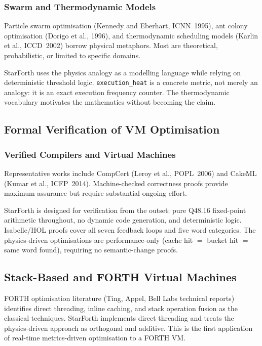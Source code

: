 \subsubsection{Swarm and Thermodynamic Models}

Particle swarm optimisation (Kennedy and Eberhart, ICNN~1995), ant colony
optimisation (Dorigo et al., 1996), and thermodynamic scheduling models
(Karlin et al., ICCD~2002) borrow physical metaphors. Most are theoretical,
probabilistic, or limited to specific domains.

StarForth uses the physics analogy as a modelling language while relying on
deterministic threshold logic. \texttt{execution\_heat} is a concrete metric,
not merely an analogy: it is an exact execution frequency counter. The
thermodynamic vocabulary motivates the mathematics without becoming the
claim.

\subsection{Formal Verification of VM Optimisation}

\subsubsection{Verified Compilers and Virtual Machines}

Representative works include CompCert (Leroy et al., POPL~2006) and CakeML
(Kumar et al., ICFP~2014). Machine-checked correctness proofs provide maximum
assurance but require substantial ongoing effort.

StarForth is designed for verification from the outset: pure Q48.16
fixed-point arithmetic throughout, no dynamic code generation, and
deterministic logic. Isabelle/HOL proofs cover all seven feedback loops and
five word categories. The physics-driven optimisations are performance-only
(cache hit $=$ bucket hit $=$ same word found), requiring no semantic-change
proofs.

\subsection{Stack-Based and FORTH Virtual Machines}

FORTH optimisation literature (Ting, Appel, Bell Labs technical reports)
identifies direct threading, inline caching, and stack operation fusion as
the classical techniques. StarForth implements direct threading and treats
the physics-driven approach as orthogonal and additive. This is the first
application of real-time metrics-driven optimisation to a FORTH VM.

